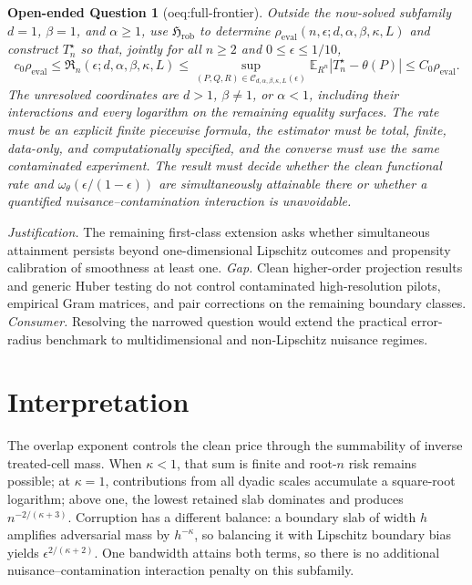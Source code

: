 \documentclass{article}
\newtheorem{openendedquestion}{Open-ended Question}
\begin{document}
\begin{openendedquestion}[oeq:full-frontier]\label{oeq:full-frontier}
Outside the now-solved subfamily \(d=1\), \(\beta=1\), and \(\alpha\geq1\), use \(\mathfrak H_{\mathrm{rob}}\) to determine \(\rho_{\mathrm{eval}}(n,\epsilon;d,\alpha,\beta,\kappa,L)\) and construct \(T_n^\star\) so that, jointly for all \(n\geq2\) and \(0\leq\epsilon\leq1/10\),
\[
c_0\rho_{\mathrm{eval}}
\leq\mathfrak R_n(\epsilon;d,\alpha,\beta,\kappa,L)
\leq\sup_{(P,Q,R)\in\mathcal C_{d,\alpha,\beta,\kappa,L}(\epsilon)}
\mathbb E_{R^n}|T_n^\star-\theta(P)|
\leq C_0\rho_{\mathrm{eval}}.
\]
The unresolved coordinates are \(d>1\), \(\beta\neq1\), or \(\alpha<1\), including their interactions and every logarithm on the remaining equality surfaces. The rate must be an explicit finite piecewise formula, the estimator must be total, finite, data-only, and computationally specified, and the converse must use the same contaminated experiment. The result must decide whether the clean functional rate and \(\omega_\theta(\epsilon/(1-\epsilon))\) are simultaneously attainable there or whether a quantified nuisance--contamination interaction is unavoidable.
\end{openendedquestion}
\par\smallskip\noindent \textit{Justification.} The remaining first-class extension asks whether simultaneous attainment persists beyond one-dimensional Lipschitz outcomes and propensity calibration of smoothness at least one. \textit{Gap.} Clean higher-order projection results and generic Huber testing do not control contaminated high-resolution pilots, empirical Gram matrices, and pair corrections on the remaining boundary classes. \textit{Consumer.} Resolving the narrowed question would extend the practical error-radius benchmark to multidimensional and non-Lipschitz nuisance regimes.

\section{Interpretation}

The overlap exponent controls the clean price through the summability of inverse treated-cell mass. When \(\kappa<1\), that sum is finite and root-\(n\) risk remains possible; at \(\kappa=1\), contributions from all dyadic scales accumulate a square-root logarithm; above one, the lowest retained slab dominates and produces \(n^{-2/(\kappa+3)}\). Corruption has a different balance: a boundary slab of width \(h\) amplifies adversarial mass by \(h^{-\kappa}\), so balancing it with Lipschitz boundary bias yields \(\epsilon^{2/(\kappa+2)}\). One bandwidth attains both terms, so there is no additional nuisance--contamination interaction penalty on this subfamily.
\end{document}
